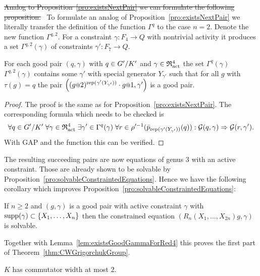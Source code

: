 \documentclass[a4paper,11pt]{amsart}
\newcommand\replace[2]{\st{#1}{\color{Green4}\ #2}}
\begin{document}
\replace{Analog to Proposition~{\ref{pro:existsNextPair}} we can formulate the following proposition.}
{
  To formulate an analog of Proposition~\ref{pro:existsNextPair} we literally transfer the definition 
  of the function $\Gamma^{q}$ to the case $n=2$. Denote the new function $\Gamma^{q,2}$.
  For a constraint $\gamma\colon F_{4} \to Q$ with nontrivial activity it produces
  a set $\Gamma^{q,2}(\gamma)$ of constraints $\gamma'\colon F_{7}\to Q$.
}
\begin{pro}\label{pro:existsNextPair4}
 For each good pair $(q,\gamma)$ with $q\in{G'/K'}$ and $\gamma\in\mathfrak{R}^4_{\operatorname{act}}$ the set 
  \replace{$\Gamma^q(\gamma)$}{$\Gamma^{q,2}(\gamma)$}
 contains some $\gamma'$ with special generator $Y_{\gamma'}$ such that for all $g$ with $\tau(g)=q$ the
 pair $\left((g\at{2})^{\rep(\gamma'(Y_{\gamma'}))}\cdot g\at{1},\gamma'\right)$ is a good pair.
\end{pro}
\begin{proof}
The proof is the same as for Proposition~\ref{pro:existsNextPair}. The corresponding formula which needs to be checked is 
\[\forall q\in{G'/K'}\;
      \forall \gamma\in\mathfrak{R}^4_{\operatorname{act}}\;
	 \exists \gamma'\in \Gamma^q(\gamma)\;
	    \forall r\in \rho'^{-1}(\bar p_{\operatorname{rep}(\gamma'(Y_{\gamma'}))}(q)):
	      \mathcal{G}(q,\gamma) \Rightarrow \mathcal{G}(r,\gamma').\]
 With GAP and the function  this can be verified. 
\end{proof}
The resulting succeeding pairs are now equations of genus $3$ with an active constraint. 
Those are already shown to be solvable 
by Proposition~\ref{pro:solvableConstraintedEquations}. Hence we have the following
corollary which improves Proposition~\ref{pro:solvableConstraintedEquations}:
\begin{cor}\label{cor:solvableConstraintedEquations}
If $n\geq2$ and $(g,\gamma)$ is a good pair with active constraint $\gamma$ with $\operatorname{{supp}}(\gamma)\subset\{X_1,\dotsc,X_{n}\}$
 then the constrained equation $(R_n(X_1,\dotsc,X_{2n})g,\gamma)$ is solvable. 
\end{cor}
Together with Lemma~\ref{lem:existsGoodGammaForRed4} this proves the first part of Theorem~\ref{thm:CWGrigorchukGroup}.
\begin{cor}\label{cor:KhasCW2}
 $K$ has commutator width at most $2$. 
\end{cor}
\end{document}

